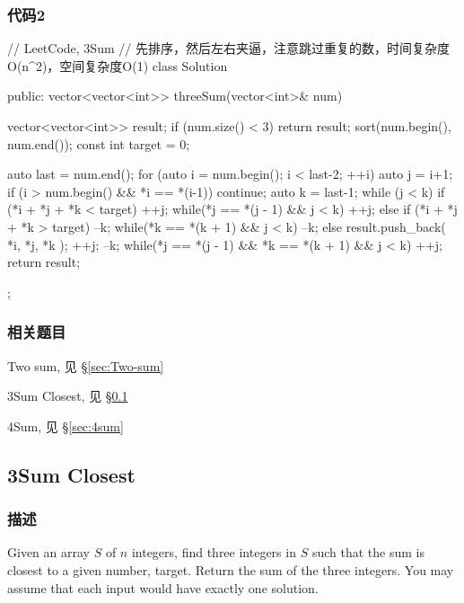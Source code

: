 \subsubsection{代码2}
\begin{Code}
// LeetCode, 3Sum
// 先排序，然后左右夹逼，注意跳过重复的数，时间复杂度O(n^2)，空间复杂度O(1)
class Solution {
    public:
    vector<vector<int>> threeSum(vector<int>& num) {
        vector<vector<int>> result;
        if (num.size() < 3) return result;
        sort(num.begin(), num.end());
        const int target = 0;
		
        auto last = num.end();
        for (auto i = num.begin(); i < last-2; ++i) {
            auto j = i+1;
            if (i > num.begin() && *i == *(i-1)) continue;
            auto k = last-1;
            while (j < k) {
                if (*i + *j + *k < target) {
                    ++j;
                    while(*j == *(j - 1) && j < k) ++j;
                } else if (*i + *j + *k > target) {
                    --k;
                    while(*k == *(k + 1) && j < k) --k;
                } else {
                    result.push_back({ *i, *j, *k });
                    ++j;
                    --k;
                    while(*j == *(j - 1) && *k == *(k + 1) && j < k) ++j;
                }
            }
        }
        return result;
    }
};
\end{Code}


\subsubsection{相关题目}
\begindot
\item Two sum, 见 \S \ref{sec:Two-sum}
\item 3Sum Closest, 见 \S \ref{sec:3sum-closest}
\item 4Sum, 见 \S \ref{sec:4sum}
\myenddot

\subsection{3Sum Closest} %
\label{sec:3sum-closest}


\subsubsection{描述}
Given an array $S$ of $n$ integers, find three integers in $S$ such that the sum is closest to a given number, target. Return the sum of the three integers. You may assume that each input would have exactly one solution.


